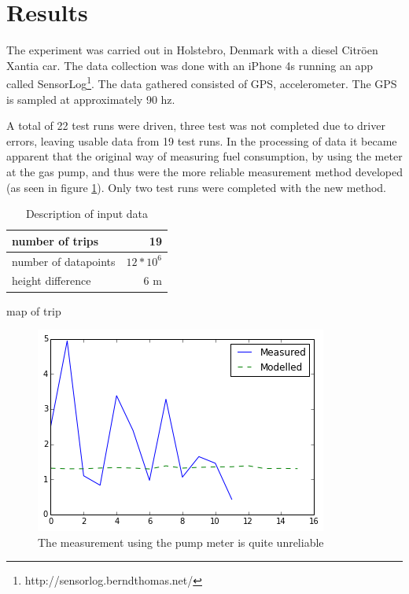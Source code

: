 \section{Results}

The experiment was carried out in Holstebro, Denmark with a diesel Citr\"oen Xantia car. The data collection was done with an iPhone 4s running an app called SensorLog\footnote{http://sensorlog.berndthomas.net/}. The data gathered consisted of GPS, accelerometer. The GPS is sampled at approximately 90 hz.

A total of 22 test runs were driven, three test was not completed due to driver errors, leaving
usable data from 19 test runs. In the processing of data it became apparent that the original way of measuring fuel consumption, by using the meter at the gas pump, and thus were the more reliable measurement method developed (as seen in figure \ref{measured}). Only two test runs were completed with the new method.

\begin{table}
\begin{tabular}{| l | r |}
\hline 
number of trips & 19 \\[0.1cm] \hline
number of datapoints & $12*10^6$\\[0.1cm] \hline
height difference & 6 m\\[0.1cm]
\hline 

\end{tabular}
\label{datatable}
\caption{Description of input data}
\end{table}
map of trip

\begin{figure}[h]
  \includegraphics[scale=0.5]{Measured_consumption}
  \caption{The measurement using the pump meter is quite unreliable}
  \label{measured}
\end{figure}

